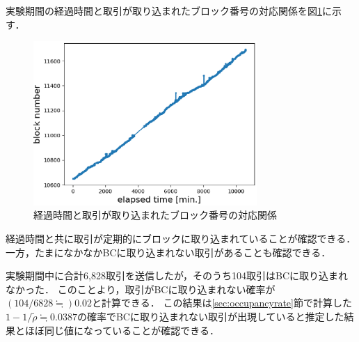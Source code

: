 \documentclass[graybox]{svmult}
\begin{document}
実験期間の経過時間と取引が取り込まれたブロック番号の対応関係を図\ref{fig:exp3-1}に示す．
%
\begin{figure}[tb]
  \begin{center}
    \includegraphics[width=85mm]{exp3-1.eps}
  \end{center}
  \caption{経過時間と取引が取り込まれたブロック番号の対応関係}
  \label{fig:exp3-1}
\end{figure}
%
経過時間と共に取引が定期的にブロックに取り込まれていることが確認できる．
一方，たまになかなかBCに取り込まれない取引があることも確認できる．

実験期間中に合計6,828取引を送信したが，そのうち104取引はBCに取り込まれなかった．
このことより，取引がBCに取り込まれない確率が$(104/6828 \fallingdotseq) 0.02$と計算できる．
この結果は\ref{sec:occupancyrate}節で計算した$1-1/\tilde{\rho} \fallingdotseq 0.0387$の確率でBCに取り込まれない取引が出現していると推定した結果とほぼ同じ値になっていることが確認できる．
\end{document}
